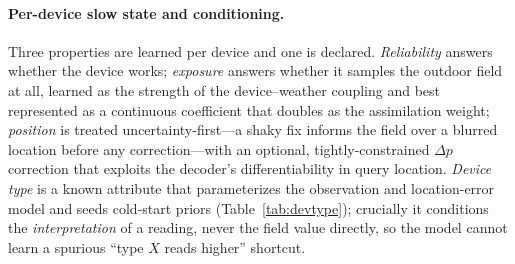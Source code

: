 \documentclass[10pt]{article}
\begin{document}
\paragraph{Per-device slow state and conditioning.}
Three properties are learned per device and one is declared. \emph{Reliability}
answers whether the device works; \emph{exposure} answers whether it samples the
outdoor field at all, learned as the strength of the device--weather coupling and
best represented as a continuous coefficient that doubles as the assimilation
weight; \emph{position} is treated uncertainty-first---a shaky fix informs the
field over a blurred location before any correction---with an optional,
tightly-constrained $\Delta p$ correction that exploits the decoder's
differentiability in query location. \emph{Device type} is a known attribute that
parameterizes the observation and location-error model and seeds cold-start priors
(Table~\ref{tab:devtype}); crucially it conditions the \emph{interpretation} of a
reading, never the field value directly, so the model cannot learn a spurious
``type $X$ reads higher'' shortcut.
\end{document}

